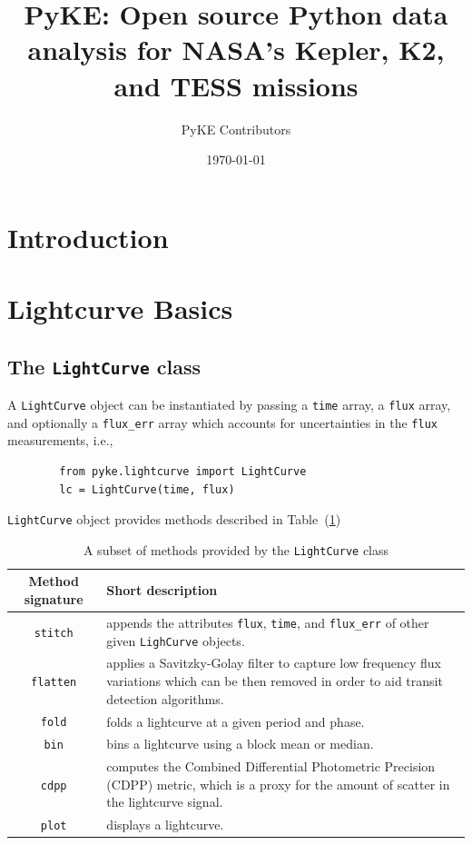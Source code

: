 \documentclass{article}
\title{PyKE: Open source Python data analysis for NASA's Kepler, K2, and TESS missions}
\author{PyKE Contributors}
\date{\today}
\begin{document}
\maketitle

\begin{abstract}

\end{abstract}

\section{Introduction}

\section{Lightcurve Basics}
    \subsection{The \texttt{LightCurve} class}
        A \texttt{LightCurve} object can be instantiated by passing a \texttt{time}
        array, a \texttt{flux} array, and optionally a \texttt{flux\_err} array which
        accounts for uncertainties in the \texttt{flux} measurements, i.e.,
        \begin{verbatim}
        from pyke.lightcurve import LightCurve
        lc = LightCurve(time, flux)
        \end{verbatim}

        \texttt{LightCurve} object provides methods described in
        Table~(\ref{tab:methods})

        \begin{table}[!htb]
            \centering
            \caption{A subset of methods provided by the \texttt{LightCurve} class}
            \begin{tabular}{cp{7cm}}
                \hline
                \textbf{Method signature} & \textbf{Short description} \\
                \hline
                \texttt{stitch} & appends the attributes \texttt{flux},
                \texttt{time}, and \texttt{flux\_err} of other given
                \texttt{LighCurve} objects.\\
                \texttt{flatten} & applies a Savitzky-Golay filter to capture
                low frequency flux variations which can be then removed in order
                to aid transit detection algorithms.\\
                \texttt{fold} & folds a lightcurve at a given period and phase.\\
                \texttt{bin} &  bins a lightcurve using a block mean or median.\\
                \texttt{cdpp} &  computes the Combined Differential Photometric
                Precision (CDPP) metric, which is a proxy for the amount of
                scatter in the lightcurve signal. \\
                \texttt{plot} & displays a lightcurve.
            \end{tabular}
            \label{tab:methods}
        \end{table}
\end{document}
